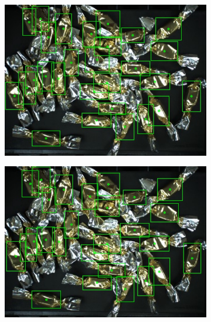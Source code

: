 \begin{figure}[ht]

  \begin{subfigure}{0.5\textwidth}
    \centering
    \includegraphics[width=0.92\linewidth]{Sources/Figures/appendix/actual_45.jpg}

  \end{subfigure}
  \begin{subfigure}{0.5\textwidth}
    \centering
    \includegraphics[width=0.92\linewidth]{Sources/Figures/appendix/pred_45.jpg}


\end{subfigure}
\end{figure}
